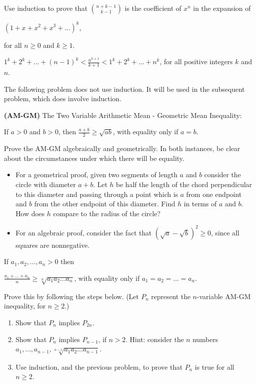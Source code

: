 \documentclass[12pt]{amsart}
\theoremstyle{definition}
\begin{document}
\problem Use induction to prove that ${n+k-1}\choose {k-1}$ is the coefficient of $x^n$ in the expansion of
\begin{center}$(1+x+x^2+x^3+\dots )^k$,\end{center} for all $n\geq 0$ and $k\geq 1$.
\vspace{.1in}

\problem $1^k+2^k+\dots +(n-1)^k < \frac{n^{k+1}}{k+1} < 1^k+2^k+\dots +n^k$, for all positive integers $k$ and $n$.
\vspace{.1in}

The following problem does not use induction. It will be used in the subsequent problem, which does involve induction.
\vspace{.1in}

\problem \textbf{(AM-GM)} The Two Variable Arithmetic Mean - Geometric Mean Inequality:
\begin{center}
If $a>0$ and $b>0$, then $\displaystyle \frac{a+b}{2}\geq \sqrt{ab}$, with equality only if $a=b$.
 \end{center}
Prove the AM-GM algebraically and geometrically.  In both instances, be clear about the circumstances under which there will be equality.
\begin{itemize}
		\item For a geometrical proof, given two segments of length $a$ and $b$ consider the circle with diameter $a+b$. Let $h$ be half the length of the chord perpendicular to this diameter and passing through a point which is $a$ from one endpoint and $b$ from the other endpoint of this diameter. Find $h$ in terms of $a$ and $b$. How does $h$ compare to the radius of the circle?
		\item For an algebraic proof, consider the fact that $(\sqrt{a}-\sqrt{b})^2\geq 0$, since all squares are nonnegative.
\end{itemize}

 \newpage

 If $a_1,a_2,\dots , a_n> 0$ then\vspace{.1in}
\begin{center}
$\displaystyle  \frac{a_1+\dots + a_n}{n}\geq  \sqrt[n]{a_1a_2\dots a_n}$, with equality only if $a_1=a_2=\dots = a_n.$
\end{center}
\vspace{.1in}

\noindent Prove this by following the steps below. (Let $P_n$ represent the $n$-variable AM-GM inequality, for $n\geq 2$.)\vspace{.05in}
\begin{enumerate}
	\item Show that $P_n$ implies $P_{2n}$.\vspace{.05in}
	\item Show that $P_{n}$ implies $P_{n-1}$, if $n>2$. Hint: consider the $n$ numbers $a_1, \dots ,a_{n-1}, \sqrt[n-1]{a_1a_2\dots a_{n-1}}$.\vspace{.05in}
	\item Use induction, and the previous problem, to prove that $P_n$ is true for all $n\geq 2$.
\end{enumerate}
\end{document}
